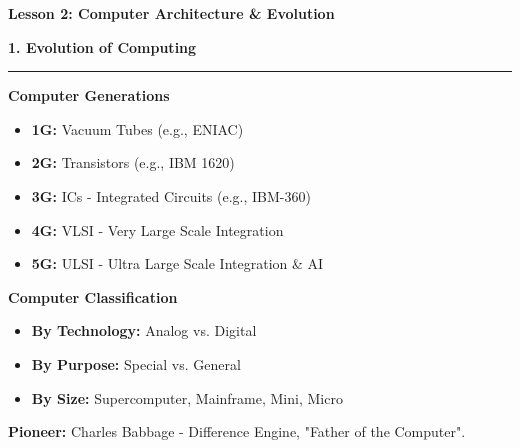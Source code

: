 \documentclass[a4paper, 8pt]{extarticle}
\newcommand{\sectionheading}[1]{\large\textbf{#1}\par\noindent\rule{\linewidth}{0.4pt}}
\newcommand{\subsectionheading}[1]{\normalsize\textbf{#1}}
\begin{document}
\pagestyle{empty} %

\begin{center}
    \fontsize{12pt}{14pt}\selectfont
    \textbf{Lesson 2: Computer Architecture \& Evolution}
\end{center}
\vspace{1em}

\begin{multicols}{2}


\sectionheading{1. Evolution of Computing}
\vspace{0.5em}
\subsectionheading{Computer Generations}
\begin{itemize}
    \item \textbf{1G:} Vacuum Tubes (e.g., ENIAC)
    \item \textbf{2G:} Transistors (e.g., IBM 1620)
    \item \textbf{3G:} ICs - Integrated Circuits (e.g., IBM-360)
    \item \textbf{4G:} VLSI - Very Large Scale Integration
    \item \textbf{5G:} ULSI - Ultra Large Scale Integration \& AI
\end{itemize}

\subsectionheading{Computer Classification}
\begin{itemize}
    \item \textbf{By Technology:} Analog vs. Digital
    \item \textbf{By Purpose:} Special vs. General
    \item \textbf{By Size:} Supercomputer, Mainframe, Mini, Micro
\end{itemize}
\begin{tcolorbox}
    \textbf{Pioneer:} Charles Babbage - Difference Engine, "Father of the Computer".
\end{tcolorbox}


\end{multicols}
\end{document}
